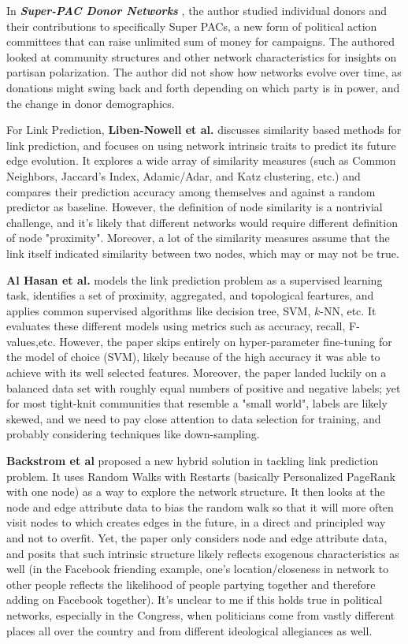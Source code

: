 \documentclass[12pt,twocolumn]{article}
\begin{document}
In \textbf{\textit{Super-PAC Donor Networks}} \cite{moody_2015}, the author studied individual donors and their contributions to specifically Super PACs, a new form of political action committees that can raise unlimited sum of money for campaigns. The authored looked at community structures and other network characteristics for insights on partisan polarization. The author did not show how networks evolve over time, as donations might swing back and forth depending on which party is in power, and the change in donor demographics. 

For Link Prediction, \textbf{Liben-Nowell et al.} \cite{liben2007link} discusses similarity based methods for link prediction, and focuses on using network intrinsic traits to predict its future edge evolution. It explores a wide array of similarity measures (such as Common Neighbors, Jaccard's Index, Adamic/Adar, and Katz clustering, etc.) and compares their prediction accuracy among themselves and against a random predictor as baseline. However, the definition of node similarity is a nontrivial challenge, and it's likely that different networks would require different definition of node "proximity". Moreover, a lot of the similarity measures assume that the link itself indicated similarity between two nodes, which may or may not be true. 

\textbf{Al Hasan et al.} \cite{al2006link} models the link prediction problem as a supervised learning task, identifies a set of proximity, aggregated, and topological feartures, and applies common supervised algorithms like decision tree, SVM, $k$-NN, etc. It evaluates these different models using metrics such as accuracy, recall, F-values,etc. However, the paper skips entirely on hyper-parameter fine-tuning for the model of choice (SVM), likely because of the high accuracy it was able to achieve with its well selected features. Moreover, the paper landed luckily on a balanced data set with roughly equal numbers of positive and negative labels; yet for most tight-knit communities that resemble a "small world", labels are likely skewed, and we need to pay close attention to data selection for training, and probably considering techniques like down-sampling. 

\textbf{Backstrom et al} \cite{backstrom2011supervised} proposed a new hybrid solution in tackling link prediction problem. It uses Random Walks with Restarts (basically Personalized PageRank with one node) as a way to explore the network structure. It then looks at the node and edge attribute data to bias the random walk so that it will more often visit nodes to which creates edges in the future, in a direct and principled way and not to overfit. Yet, the paper only considers node and edge attribute data, and posits that such intrinsic structure likely reflects exogenous characteristics as well (in the Facebook friending example, one’s location/closeness in network to other people reflects the likelihood of people partying together and therefore adding on Facebook together). It’s unclear to me if this holds true in political networks, especially in the Congress, when politicians come from vastly different places all over the country and from different ideological allegiances as well.
\end{document}
